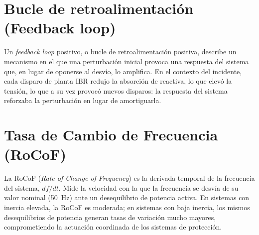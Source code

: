 \section{Bucle de retroalimentación (Feedback loop)}
\label{anexo:feedback_loop}
Un \textit{feedback loop} positivo, o bucle de retroalimentación positiva, describe un mecanismo en el que una perturbación inicial provoca una respuesta del sistema que, en lugar de oponerse al desvío, lo amplifica. En el contexto del incidente, cada disparo de planta IBR redujo la absorción de reactiva, lo que elevó la tensión, lo que a su vez provocó nuevos disparos: la respuesta del sistema reforzaba la perturbación en lugar de amortiguarla.

\section{Tasa de Cambio de Frecuencia (RoCoF)}
\label{anexo:rocof}
La RoCoF (\textit{Rate of Change of Frequency}) es la derivada temporal de la frecuencia del sistema, $df/dt$. Mide la velocidad con la que la frecuencia se desvía de su valor nominal (50~Hz) ante un desequilibrio de potencia activa. En sistemas con inercia elevada, la RoCoF es moderada; en sistemas con baja inercia, los mismos desequilibrios de potencia generan tasas de variación mucho mayores, comprometiendo la actuación coordinada de los sistemas de protección.